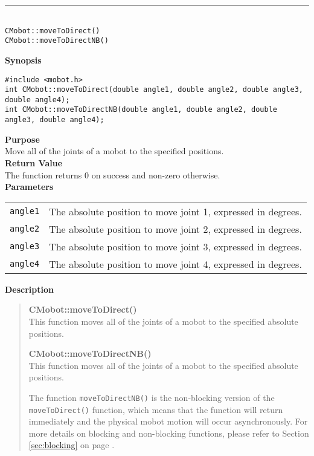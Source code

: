 \noindent
\vspace{5pt}
\rule{4.5in}{0.015in}\\
\noindent
{\LARGE \texttt{CMobot::moveToDirect()}}\\
{\LARGE \texttt{CMobot::moveToDirectNB()}}\\
{}

\noindent
{\bf Synopsis}
\vspace{-8pt}
\begin{verbatim}
#include <mobot.h>
int CMobot::moveToDirect(double angle1, double angle2, double angle3, double angle4);
int CMobot::moveToDirectNB(double angle1, double angle2, double angle3, double angle4);
\end{verbatim}

\noindent
{\bf Purpose}\\
Move all of the joints of a mobot to the specified positions.\\

\noindent
{\bf Return Value}\\
The function returns 0 on success and non-zero otherwise.\\

\noindent
{\bf Parameters}\\
\vspace{-0.1in}
\begin{description}
\item               
\begin{tabular}{p{15 mm}p{105 mm}}
\texttt{angle1} & The absolute position to move joint 1, expressed in degrees. \\
\texttt{angle2} & The absolute position to move joint 2, expressed in degrees. \\
\texttt{angle3} & The absolute position to move joint 3, expressed in degrees. \\
\texttt{angle4} & The absolute position to move joint 4, expressed in degrees. \\
\end{tabular}
\end{description}
\noindent

{\bf Description}\\
\vspace{-12pt}
\begin{quote}
{\bf CMobot::moveToDirect()}\\
This function moves all of the joints of a mobot to the specified absolute positions. 

{\bf CMobot::moveToDirectNB()}\\
This function moves all of the joints of a mobot to the specified absolute positions. 

The function \texttt{moveToDirectNB()} is the non-blocking version of
the \texttt{moveToDirect()} function, which means that the function will return
immediately and the physical mobot motion will occur asynchronously. For
more details on blocking and non-blocking functions, please refer to 
Section \ref{sec:blocking} on page \pageref{sec:blocking}.\\
\end{quote}

